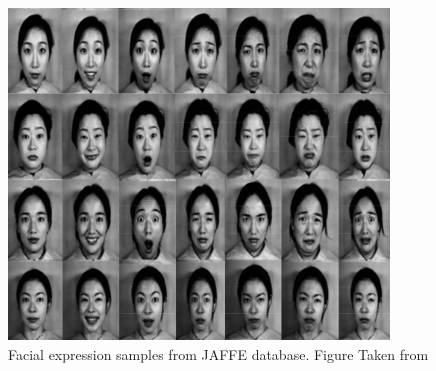 \begin{figure}[!htb]	\includegraphics[width=0.9\textwidth]{images/jaffe.png} 
    \centering

\caption{
Facial expression samples from JAFFE \cite{LyonsCodingWavelets} database. Figure Taken from \cite{Sarode2010FacialRecognition}
} 

\label{fig:facial_expressions}
\end{figure}